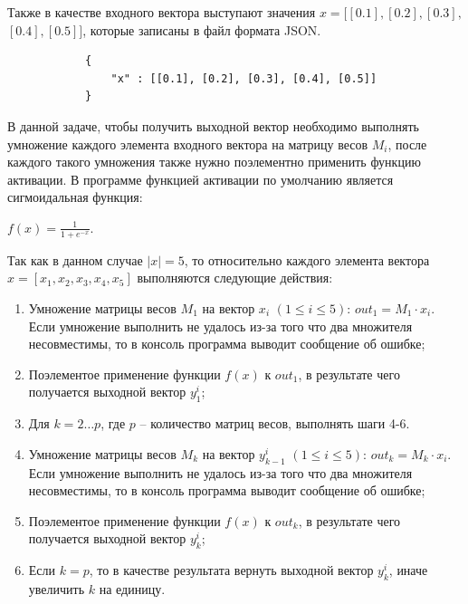 \documentclass[bachelor, och, otchet]{template}
\begin{document}
        Также в качестве входного вектора выступают значения $x = [[0.1], [0.2], [0.3],$ \\$[0.4], [0.5]]$, 
        которые записаны в файл формата JSON.

        \begin{verbatim}
            {
                "x" : [[0.1], [0.2], [0.3], [0.4], [0.5]]
            }
        \end{verbatim}

        В данной задаче, чтобы получить выходной вектор необходимо выполнять умножение каждого элемента входного вектора на
        матрицу весов $M_i$, после каждого такого умножения также нужно поэлементно применить функцию активации. В программе функцией
        активации по умолчанию является сигмоидальная функция:
        
        \begin{center}
            $f(x) = \frac{1}{1 + e^{-x}}$.
        \end{center}

        Так как в данном случае $|x| = 5$, то относительно каждого элемента вектора $x = [x_1, x_2, x_3, x_4, x_5]$ 
        выполняются следующие действия:

        \begin{enumerate}
            \item Умножение матрицы весов $M_1$ на вектор $x_i$ $(1 \leq i \leq 5)$: $out_1 = M_1 \cdot x_i$.
            Если умножение выполнить не удалось из-за того что два множителя несовместимы, то в консоль программа
            выводит сообщение об ошибке;
            \item Поэлементое применение функции $f(x)$ к $out_1$, в результате чего получается выходной вектор $y_1^{i}$;
            \item Для $k = 2 \dots p$, где $p$ -- количество матриц весов, выполнять шаги 4-6.
            \item Умножение матрицы весов $M_k$ на вектор $y_{k - 1}^{i}$ $(1 \leq i \leq 5)$: $out_k = M_k \cdot x_i$.
            Если умножение выполнить не удалось из-за того что два множителя несовместимы, то в консоль программа
            выводит сообщение об ошибке;
            \item Поэлементое применение функции $f(x)$ к $out_k$, в результате чего получается выходной вектор $y_k^{i}$;
            \item Если $k = p$, то в качестве результата вернуть выходной вектор $y_k^{i}$, иначе увеличить $k$ на единицу.
        \end{enumerate}
\end{document}
